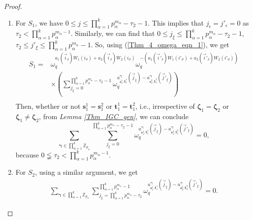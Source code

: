 \documentclass[pdflatex,sn-mathphys-num]{sn-jnl}%
\theoremstyle{thmstyleone}
\begin{document}
\begin{proof}
\begin{mycases}
			\begin{enumerate}
				\item For $S_1$, we have $0 \leq j \leq \prod_{\alpha=1}^{k} p_\alpha^{m_\alpha} -\tau_2-1$. This implies that $j_{\epsilon}=j'_{\epsilon}=0$ as $\tau_2 < \prod_{\alpha=1}^{k} p_\alpha^{m_\alpha-1}$. Similarly, we can find that  $0 \leq j_{\xi} \leq \prod_{\alpha=1}^{k} p_\alpha^{m_\alpha} -\tau_2-1$,  $\tau_2 \leq j'_{\xi} \leq \prod_{\alpha=1}^{k} p_\alpha^{m_\alpha}-1$. So, using (\ref{Thm_4_omega_eqn_1}), we get
				\begin{equation}
					\begin{split}
						S_1= &\omega_q^{a_1(\vec{i}_{\delta}) W_1(i_\vartheta) + a_2(\vec{i}_{\delta}) W_2(i_\vartheta)} \omega_q^{- \left( a_1(\vec{i}'_{\delta}) W_1(i'_\vartheta) + a_2(\vec{i}'_{\delta}) W_2(i'_\vartheta) \right)}\\
						& \times \left( \sum_{j_{\xi}=0}^{\prod_{\alpha=1}^{k} p_\alpha^{m_\alpha} -\tau_2-1} \omega_q^{a_{\mathbf{s}_1^1,\mathbf{t}_1^1}^{\bm{\gamma}} (\vec{j}_{\xi})-a_{\mathbf{s}_1^2,\mathbf{t}_1^2}^{\bm{\gamma}} (\vec{j}'_{\xi}) } \right)\\
					\end{split}
				\end{equation}
				Then, whether or not $\mathbf{s}_1^1= \mathbf{s}_1^2$ or $\mathbf{t}_1^1= \mathbf{t}_1^2$, i.e., irrespective of $\bm{\zeta}_1 = \bm{\zeta}_2$ or $\bm{\zeta}_1 \neq \bm{\zeta}_2$, from \textit{Lemma \ref{Thm_IGC_gen}}, we can conclude
				\begin{equation}\label{eqn_S1}
					\sum_{\bm{\gamma} \in \prod_{\alpha=1}^{k} \mathbb{Z}_{p_\alpha}}^{} \sum_{j_{\xi}=0}^{\prod_{\alpha=1}^{k} p_\alpha^{m_\alpha} -\tau_2-1} \omega_q^{a_{\mathbf{s}_1^1,\mathbf{t}_1^1}^{\bm{\gamma}} (\vec{j}_{\xi})-a_{\mathbf{s}_1^2,\mathbf{t}_1^2}^{\bm{\gamma}} (\vec{j}'_{\xi}) }=0,
				\end{equation}
				because $0 \lneqq \tau_2 <  \prod_{\alpha=1}^{k} p_\alpha^{m_\alpha-1}$.
				
				\item For $S_2$, using a similar argument, we get
				\begin{equation}\label{eqn_S2}
					\begin{split}
						\sum_{\bm{\gamma} \in \prod_{\alpha=1}^{k} \mathbb{Z}_{p_\alpha}}^{} \sum_{j_{\xi}=\prod_{\alpha=1}^{k} p_\alpha^{m_\alpha} -\tau_2}^{\prod_{\alpha=1}^{k}  p_\alpha^{m_\alpha}-1} \omega_q^{a_{\mathbf{s}_1^1,\mathbf{t}_1^1}^{\bm{\gamma}} (\vec{j}_{\xi})-a_{\mathbf{s}_2^2,\mathbf{t}_2^2}^{\bm{\gamma}} (\vec{j}'_{\xi}) }=0.
					\end{split}
				\end{equation}
				

\end{enumerate}
\end{mycases}
\end{proof}
\end{document}
